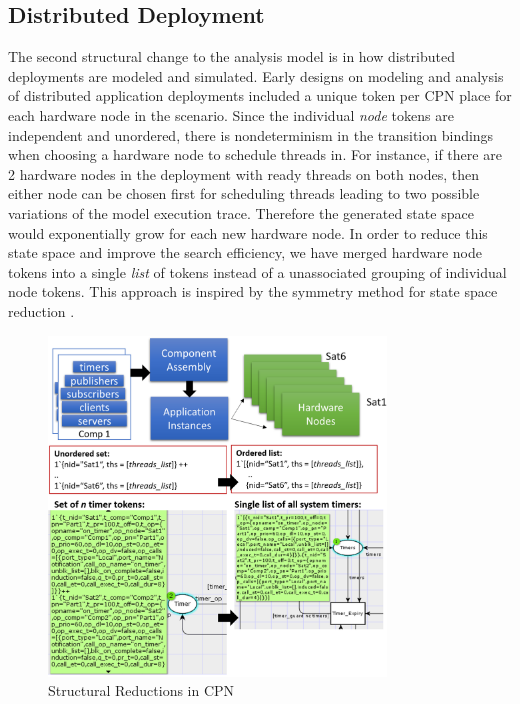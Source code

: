 \subsection{Distributed Deployment} 
\label{distributed_deployment}

The second structural change to the analysis model is in how distributed deployments are modeled and simulated. Early designs on modeling and analysis of distributed application deployments \cite{kumar2014colored} included a unique token per CPN place for each hardware node in the scenario. Since the individual \emph{node} tokens are independent and unordered, there is nondeterminism in the transition bindings when choosing a hardware node to schedule threads in. For instance, if there are 2 hardware nodes in the deployment with ready threads on both nodes, then either node can be chosen first for scheduling threads leading to two possible variations of the model execution trace. Therefore the generated state space would exponentially grow for each new hardware node. In order to reduce this state space and improve the search efficiency, we have merged hardware node tokens into a single \emph{list} of tokens instead of a unassociated grouping of individual node tokens. This approach is inspired by the symmetry method for state space reduction \cite{Kristensen2000}.

\begin{figure}[h]
	\centering
	\includegraphics[width=0.8\textwidth]{./figs/dd}
	\caption{Structural Reductions in CPN}
	\label{fig:dd}
\end{figure}




